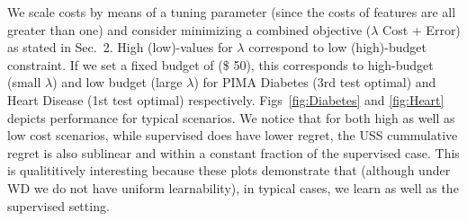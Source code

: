 We scale costs by means of a tuning parameter (since the costs of features are all greater than one) and consider minimizing a combined objective ($\lambda$ Cost + Error) as stated in Sec.~2. High (low)-values for $\lambda$ correspond to low (high)-budget constraint. If we set a fixed budget of (\$ 50), this corresponds to high-budget (small $\lambda$) and low budget (large $\lambda$) for PIMA Diabetes (3rd test optimal) and Heart Disease (1st test optimal) respectively. Figs~\ref{fig:Diabetes} and \ref{fig:Heart} depicts performance for typical scenarios. We notice that for both high as well as low cost scenarios, while supervised does have lower regret, the USS cummulative regret is also sublinear and within a constant fraction of the supervised case. This is qualititively interesting because these plots demonstrate that (although under WD we do not have uniform learnability), in typical cases, we learn as well as the supervised setting. %



%


